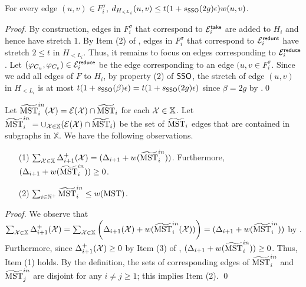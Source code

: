 \begin{lemma}\label{lm:Hi-StretchT2} For every edge $(u,v) \in F^\sigma_{i}$, $d_{H_{< L_i}}(u,v) \leq t(1+ s_{\mathsf{SSO}}(2g)\epsilon)w(u,v)$.
\end{lemma}
\begin{proof}
	By construction, edges in $F^{\sigma}_i$ that correspond to $\mathcal{E}_i^{\mathsf{take}}$ are added to $H_i$ and hence have stretch $1$. By Item (2) of , edges in $F^{\sigma}_i$ that correspond to $\mathcal{E}_i^{\mathsf{redunt}}$ have stretch $2 \leq t$ in $H_{< L_i}$. Thus, it remains to focus on edges corresponding to $\mathcal{E}_i^{\mathsf{reduce}}$. Let $(\varphi_{C_u},\varphi_{C_v}) \in \mathcal{E}^{\mathsf{reduce}}_i$ be the edge corresponding to an edge $(u,v \in F^{\sigma}_i$. 	Since we add all edges of $F$ to $H_i$, by property (2) of \hyperlink{SPHigh}{$\mathsf{SSO}$}, the stretch of edge $(u,v)$ in $H_{< L_i}$ is at most $t(1+s_{\mathsf{SSO}}(\beta)\epsilon) = t(1+s_{\mathsf{SSO}}(2g)\epsilon)$ since $\beta  = 2g$ by .\qed
	\end{proof}




 Let $\widetilde{\mathrm{MST}}^{in}_i(\mathcal{X}) = \mathcal{E}(\mathcal{X})\cap \widetilde{\mathrm{MST}}_i$ for each $\mathcal{X} \in \mathbb{X}$. Let $\widetilde{\mathrm{MST}}^{in}_i = \cup_{\mathcal{X} \in \mathbb{X}}(\mathcal{E}(\mathcal{X})\cap \widetilde{\mathrm{MST}}_i)$ be the set of $\widetilde{\mathrm{MST}}_i$ edges that are contained in subgraphs in $\mathbb{X}$.  We have the following observations.

\begin{observation}\label{obs:supportingPropHiT2}
	\begin{enumerate}[noitemsep]
	\item[(1)]  $\sum_{\mathcal{X} \in\mathbb{X}} \Delta^+_{i+1}(\mathcal{X}) = (\Delta_{i+1} + w(\widetilde{\mathrm{MST}}^{in}_i))$. Furthermore, $(\Delta_{i+1} + w(\widetilde{\mathrm{MST}}^{in}_i))\geq 0$.
	\item[(2)] $\sum_{i\in \mathbb{N}^+} \widetilde{\mathrm{MST}}^{in}_i\leq w(\mathrm{MST})$.
	\end{enumerate}
\end{observation}
\begin{proof}
	We observe that $\sum_{\mathcal{X} \in\mathbb{X}} \Delta^+_{i+1}(\mathcal{X}) = \sum_{\mathcal{X} \in \mathbb{X}} \left(\Delta_{i+1}(\mathcal{X}) + w(\widetilde{\mathrm{MST}}^{in}_i(\mathcal{X}))\right) = (\Delta_{i+1} + w(\widetilde{\mathrm{MST}}^{in}_i))$ by . Furthermore, since $ \Delta^+_{i+1}(\mathcal{X})\geq 0$ by Item (3) of , $(\Delta_{i+1} + w(\widetilde{\mathrm{MST}}^{in}_i))\geq 0$. Thus, Item (1) holds.
	By the definition, the sets of corresponding edges of $\widetilde{\mathrm{MST}}^{in}_i$ and $\widetilde{\mathrm{MST}}^{in}_j$ are disjoint for any $i\not=j \geq 1$; this implies Item (2). 	\qed
\end{proof}


